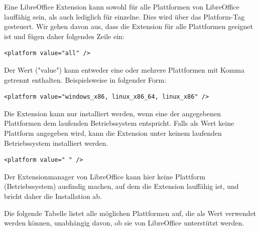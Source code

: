 \documentclass[a4paper,10pt,pagesize,titlepage]{scrbook}
\begin{document}
Eine LibreOffice Extension kann sowohl für alle Plattformen von LibreOffice lauffähig sein, als auch lediglich für einzelne. Dies wird über das Platform-Tag gesteuert. Wir gehen davon aus, dass die Extension für alle Plattformen geeignet ist und fügen daher folgendes Zeile ein:
\begin{lstlisting}
<platform value="all" />
\end{lstlisting}
Der Wert ("value") kann entweder eine oder mehrere Plattformen mit Komma getrennt enthalten. Beispielsweise in folgender Form:
\begin{lstlisting}
<platform value="windows_x86, linux_x86_64, linux_x86" /> 
\end{lstlisting} 
Die Extension kann nur installiert werden, wenn eine der angegebenen Plattformen dem laufenden Betriebssystem entspricht. Falls als Wert keine Plattform angegeben wird, kann die Extension unter keinem laufenden Betriebssystem installiert werden.
\begin{lstlisting}
<platform value=" " />
\end{lstlisting}
Der Extensionmanager von LibreOffice kann hier keine Plattform (Betriebssystem) ausfindig machen, auf dem die Extension lauffähig ist, und bricht daher die Installation ab.

Die folgende Tabelle listet alle möglichen Plattformen auf, die als Wert verwendet werden können, unabhängig davon, ob sie von LibreOffice unterstützt werden.\linebreak
\end{document}
